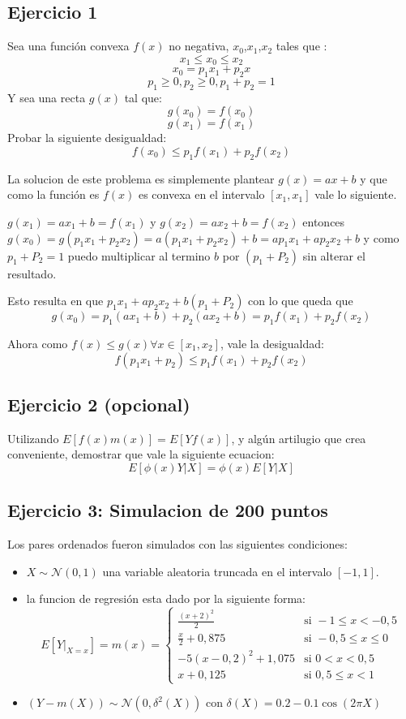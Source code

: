 \documentclass[12pt, a4paper]{article}
\begin{document}
\subsection{Ejercicio 1}

Sea una función convexa $f(x)$ no negativa, $x_0$,$x_1$,$x_2$ tales que :
 		$$x_1 \leq x_0 \leq x_2$$
		$$x_0 = p_1 x_1 + p_2 x$$
		$$p_1 \geq 0, p_2 \geq 0, p_1+p_2 = 1 $$
Y sea una recta $g(x)$ tal que:
		$$g(x_0) = f(x_0)$$
		$$g(x_1) = f(x_1)$$
Probar la siguiente desigualdad:
		$$f(x_0) \leq p_1f(x_1) + p_2f(x_2)$$

La solucion de este problema es simplemente plantear $g(x) = ax+b$ y que como la función es  $f(x)$ es convexa en el intervalo $[x_1, x_1]$ vale lo siguiente.

$g(x_1) = ax_1+b = f(x_1) $ y $g(x_2) = ax_2+b = f(x_2) $ entonces $g(x_0) = g(p_1x_1+p_2x_2)=a(p_1x_1+p_2x_2)+b = ap_1x_1+ap_2x_2+b$ y como $p_1+P_2=1$ puedo multiplicar al termino $b$ por $(p_1+P_2)$ sin alterar el resultado.

Esto resulta en que $p_1x_1+ap_2x_2+b(p_1+P_2)$ con lo que queda que
	$$g(x_0) = p_1(ax_1+b)+p_2(ax_2+b) = p_1f(x_1)+p_2f(x_2)$$

Ahora como $f(x) \leq g(x) \forall x \in [x_1,x_2]$, vale la desigualdad:
	$$f(p_1 x_1 + p_2) \leq p_1f(x_1)+p_2f(x_2)$$

\subsection{Ejercicio 2 (opcional)}

Utilizando $E[f(x)m(x)] = E[Yf(x)]$, y algún artilugio que crea conveniente, demostrar que vale la siguiente ecuacion:
		$$E[\phi(x)Y|X] = \phi(x)E[Y|X]$$

\subsection{Ejercicio 3: Simulacion de 200 puntos}
Los pares ordenados fueron simulados con las siguientes condiciones:
\begin{itemize}
    \item  $X\sim\mathcal{N}(0,1)$ una variable aleatoria truncada en el intervalo $[-1,1]$.
    \item la funcion de regresión esta dado por la siguiente forma:
$$E[Y|_{X=x}]=m(x)=
\begin{cases}
    \frac{(x+2)^2}{2}   &\text{si } -1\leq x<-0,5      \\
    \frac{x}{2} + 0,875 &\text{si } -0,5\leq x \leq 0 \\
    -5(x-0,2)^2 + 1,075 &\text{si } 0 < x < 0,5       \\
    x+0,125             &\text{si } 0,5\leq x <1
\end{cases}
$$
    \item $(Y-m(X))\sim\mathcal{N}(0,\delta^2(X))$ con $\delta(X)=0.2-0.1\cos(2\pi X)$
\end{itemize}
\end{document}
